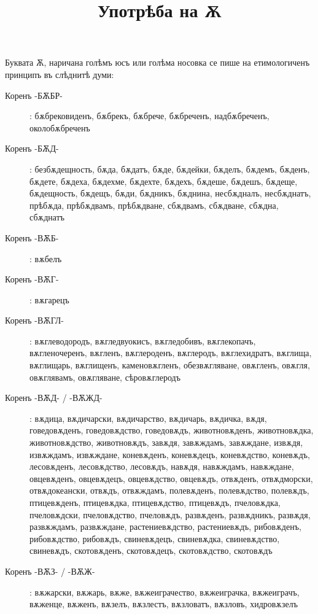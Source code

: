 \documentclass{article}
\begin{document}
	\title{Употрѣба на Ѫ}
	\maketitle
	    
	Буквата Ѫ, наричана голѣмъ юсъ или голѣма носовка се пише на етимологиченъ принципъ въ слѣднитѣ думи:
 
 	\begin{description}
 		\item [Коренъ -БѪБР-]: бѫбрековиденъ, бѫбрекъ, бѫбрече, бѫбреченъ, надбѫбреченъ, околобѫбреченъ
 		\item[Коренъ -БѪД-]: безбѫдещность, бѫда, бѫдатъ, бѫде, бѫдейки, бѫделъ, бѫдемъ, бѫденъ, бѫдете, бѫдеха, бѫдехме, бѫдехте, бѫдехъ, бѫдеше, бѫдешъ, бѫдеще, бѫдещность, бѫдещъ, бѫди, бѫдникъ, бѫднина, несбѫдналъ, несбѫднатъ, прѣбѫда, прѣбѫдвамъ, прѣбѫдване, сбѫдвамъ, сбѫдване, сбѫдна, сбѫднатъ
 		
 		\item[Коренъ -ВѪБ-]: вѫбелъ
 		
 		\item[Коренъ -ВѪГ-]: вѫгарецъ
 		
 		\item[Коренъ -ВѪГЛ-]: вѫглеводородъ, вѫгледвуокисъ, вѫгледобивъ, вѫглекопачъ, вѫгленочеренъ, вѫгленъ, вѫглероденъ, вѫглеродъ, вѫглехидратъ, вѫглища, вѫглищарь, вѫглищенъ, каменовѫгленъ, обезвѫгляване, овѫгленъ, овѫгля, овѫглявамъ, овѫгляване, сѣровѫглеродъ
 		\item[Коренъ -ВѪД- / -ВѪЖД-] : вѫдица, вѫдичарски, вѫдичарство, вѫдичарь, вѫдичка, вѫдя, говедовѫденъ, говедовѫдство, говедовѫдъ, животновѫденъ, животновѫдка, животновѫдство, животновѫдъ, завѫдя, завѫждамъ, завѫждане, извѫдя, извѫждамъ, извѫждане, коневѫденъ, коневѫдецъ, коневѫдство, коневѫдъ, лесовѫденъ, лесовѫдство, лесовѫдъ, навѫдя, навѫждамъ, навѫждане, овцевѫденъ, овцевѫдецъ, овцевѫдство, овцевѫдъ, отвѫденъ, отвѫдморски, отвѫдокеански, отвѫдъ, отвѫждамъ, полевѫденъ, полевѫдство, полевѫдъ, птицевѫденъ, птицевѫдка, птицевѫдство, птицевѫдъ, пчеловѫдка, пчеловѫдски, пчеловѫдство, пчеловѫдъ, развѫденъ, развѫдникъ, развѫдя, развѫждамъ, развѫждане, растениевѫдство, растениевѫдъ, рибовѫденъ, рибовѫдство, рибовѫдъ, свиневѫдецъ, свиневѫдка, свиневѫдство, свиневѫдъ, скотовѫденъ, скотовѫдецъ, скотовѫдство, скотовѫдъ

    	\item[Коренъ -ВѪЗ- / -ВѪЖ-]: вѫжарски, вѫжарь, вѫже, вѫжеиграчество, вѫжеиграчка, вѫжеиграчъ, вѫженце, вѫженъ, вѫзелъ, вѫзлестъ, вѫзловатъ, вѫзловъ, хидровѫзелъ


\end{description}
\end{document}
